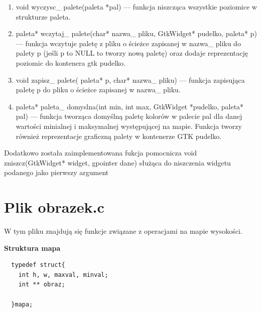 \documentclass[a4paper]{article}
\begin{document}
\begin{enumerate}
\begin{enumerate}
  \item{void wyczysc\_ palete(paleta *pal)} --- funkcja niszcząca wszystkie poziomice w strukturze paleta.
  
  \item{paleta* wczytaj\_ palete(char* nazwa\_ pliku, GtkWidget* pudelko, paleta* p) } --- funkcja wczytuje paletę z pliku o ścieżce zapisanej w nazwa\_ pliku do palety p (jeśli p to NULL to tworzy nową paletę) oraz dodaje reprezentację poziomic do kontenera gtk pudelko.
  
  \item{void zapisz\_ palete( paleta* p, char* nazwa\_ pliku)} --- funkcja zapisująca paletę p do pliku o ścieżce zapisanej w nazwa\_ pliku.
  
  \item{paleta* paleta\_ domyslna(int min, int max, GtkWidget *pudelko, paleta* pal)} --- funkcja tworząca domyślną paletę kolorów w palecie pal dla danej wartości minialnej i maksymalnej występującej na mapie. Funkcja tworzy również reprezentacje graficzną palety w kontenerze GTK pudelko.
  
  \end{enumerate}
  \end{enumerate}
  Dodatkowo została zaimplementowana fukcja pomocnicza void zniszcz(GtkWidget* widget, gpointer dane) służąca do niszczenia widgetu podanego jako pierwszy argument
  
  \section{Plik obrazek.c}
  W tym pliku znajdują się funkcje związane z operacjami na mapie wysokości.
  
 
	\textbf{Struktura mapa}
  	\begin{lstlisting}
  typedef struct{
    int h, w, maxval, minval;
    int ** obraz;
        
  }mapa;
   \end{lstlisting}  
   
\end{document}
